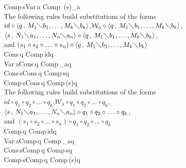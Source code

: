 \documentclass[11pt]{amsart}
\def\ruleone#1#2{\prooftree #1 \justifies #2 \endprooftree}
\def\ruletwo#1#2#3{\ruleone{#1\quad #2}{#3}}
\theoremstyle{plain}
\theoremstyle{definition}
\theoremstyle{remark}
\numberwithin{equation}{section}
\newcommand{\ci}{\circ}
\newcommand{\mi}{\,,\,}
\newcommand{\is}{\diagdown}
\newcommand{\la}{\langle}
\newcommand{\ra}{\rangle}
\newcommand{\var}{Var\,}
\newcommand{\compsub}{Comp\,}
\newcommand{\conssub}{Cons\,}
\renewcommand{\pi}{\mathcal{W}}
\begin{document}
\ruletwo{\compsub  s}{\var a}{\compsub
(s)\ci\pi_a}\\[5pt]


The following rules build substitutions of the forms\\[1pt]
$id\ci\la q\mi M_1\is b_1,\ldots,M_k\is b_k\ra$,\quad $\pi_a\ci\la
q\mi M_1\is
b_1,\ldots,M_k\is b_k\ra$,\\
  $\la s\mi N_1\is a_1,\ldots,N_n\is
a_n\ra\ci\la q\mi M_1\is
b_1,\ldots,M_k\is b_k\ra$,\\
and $(s_1\ci s_2\ci\ldots\ci s_n)\ci\la q\mi M_1\is
b_1,\ldots,M_k\is b_k\ra$\\[5pt]


\ruleone{\conssub q}{\compsub id\ci q}\\[5pt]

\ruletwo{\var a}{\conssub q}{\compsub \pi_a\ci q}\\[5pt]

\ruletwo{\conssub s}{\conssub q}{\compsub s\ci q}\\[5pt]

\ruletwo{\compsub  s}{\conssub  q}{\compsub (s)\ci q}\\[5pt]

The following rules build substitutions of the forms\\[1pt]
$id\ci q_1\ci q_2\ci\ldots\ci q_k$,\quad $\pi_a\ci q_1\ci
q_2\ci\ldots\ci q_k$,\\ $\la s\mi N_1\is a_1,\ldots, N_n\is
a_n\ra\ci q_1\ci q_2\ci\ldots\ci q_k$,\\
 and $(s_1\ci s_2\ci\ldots\ci
s_n)\ci q_1\ci q_2\ci\ldots\ci q_k$\\[5pt]


\ruleone{\compsub  q}{\compsub  id\ci q}\\[5pt]

\ruletwo{\var a}{\compsub  q}{\compsub  \pi_a\ci q}\\[5pt]

\ruletwo{\conssub  s}{\compsub  q}{\compsub  s\ci q}\\[5pt]

\ruletwo{\compsub  s}{\compsub  q}{\compsub (s)\ci q}\\[5pt]

\newpage



\end{document}

